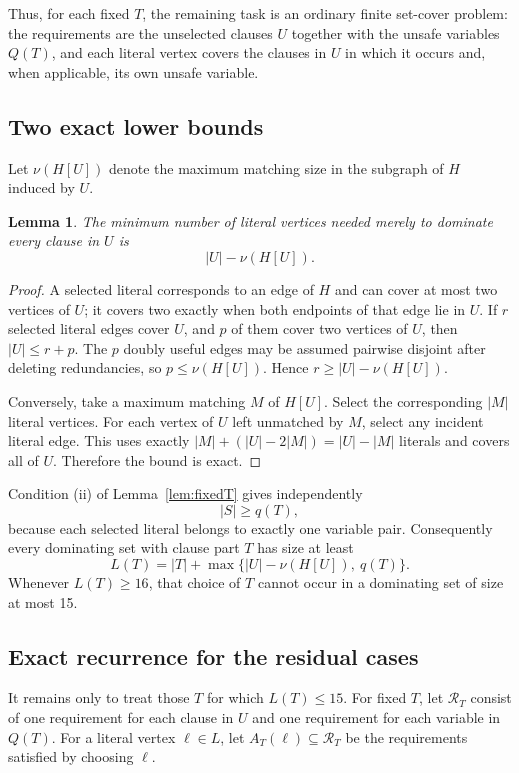 \documentclass[11pt]{article}
\newtheorem{lemma}[theorem]{Lemma}
\theoremstyle{definition}
\theoremstyle{remark}
\begin{document}
Thus, for each fixed \(T\), the remaining task is an ordinary finite set-cover problem: the requirements are the unselected clauses \(U\) together with the unsafe variables \(Q(T)\), and each literal vertex covers the clauses in \(U\) in which it occurs and, when applicable, its own unsafe variable.

\subsection{Two exact lower bounds}
Let \(\nu(H[U])\) denote the maximum matching size in the subgraph of \(H\) induced by \(U\).

\begin{lemma}\label{lem:edgecover}
The minimum number of literal vertices needed merely to dominate every clause in \(U\) is
\[
|U|-\nu(H[U]).
\]
\end{lemma}

\begin{proof}
A selected literal corresponds to an edge of \(H\) and can cover at most two vertices of \(U\); it covers two exactly when both endpoints of that edge lie in \(U\).  If \(r\) selected literal edges cover \(U\), and \(p\) of them cover two vertices of \(U\), then \(|U|\le r+p\).  The \(p\) doubly useful edges may be assumed pairwise disjoint after deleting redundancies, so \(p\le\nu(H[U])\).  Hence \(r\ge |U|-\nu(H[U])\).

Conversely, take a maximum matching \(M\) of \(H[U]\).  Select the corresponding \(|M|\) literal vertices.  For each vertex of \(U\) left unmatched by \(M\), select any incident literal edge.  This uses exactly
\(|M|+(|U|-2|M|)=|U|-|M|\) literals and covers all of \(U\).  Therefore the bound is exact.
\end{proof}

Condition (ii) of Lemma~\ref{lem:fixedT} gives independently
\[
|S|\ge q(T),
\]
because each selected literal belongs to exactly one variable pair.  Consequently every dominating set with clause part \(T\) has size at least
\begin{equation}\label{eq:LB}
L(T)=|T|+\max\bigl\{|U|-\nu(H[U]),\ q(T)\bigr\}.
\end{equation}
Whenever \(L(T)\ge16\), that choice of \(T\) cannot occur in a dominating set of size at most 15.

\subsection{Exact recurrence for the residual cases}\label{sec:recurrence}
It remains only to treat those \(T\) for which \(L(T)\le15\).  For fixed \(T\), let \(\mathcal R_T\) consist of one requirement for each clause in \(U\) and one requirement for each variable in \(Q(T)\).  For a literal vertex \(\ell\in L\), let \(A_T(\ell)\subseteq\mathcal R_T\) be the requirements satisfied by choosing \(\ell\).
\end{document}
